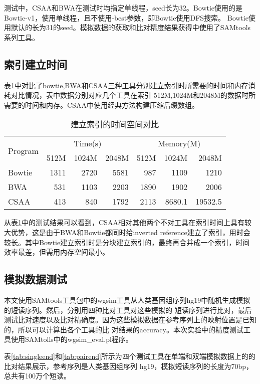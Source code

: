 测试中，CSAA和BWA在测试时均指定单线程，seed长为32。Bowtie使用的是Bowtie-v1，使用单线程，且不使用-best参数，即Bowtie使用DFS搜索。
Bowtie使用默认的长为31的seed。模拟数据的获取和比对精度结果获得中使用了SAMtools系列工具。

\subsection{索引建立时间}
表\ref{tab:tab1}中对比了bowtie,BWA和CSAA三种工具分别建立索引时所需要的时间和内存消耗对比情况，表中数据分别对应几个工具在索引
512M,1024M和2048M的数据时所需要的时间和内存。CSAA中使用经典方法构建压缩后缀数组。

\begin{table}[htbp]
    \caption{建立索引的时间空间对比}
    \label{tab:tab1}
    \centering
    \begin{tabular}{lrrrrrr}
        \hline
        \multirow{2}{*}{Program} & \multicolumn{3}{c}{Time(s)} & \multicolumn{3}{c}{Memory(M)}\\
        \cline{2-4}
        \cline{5-7}
        & 512M &1024M &2048M &512M &1024M &2048M\\
        \hline
        Bowtie&1311 &2720 &5581 &987 &1109 &1210 \\
        BWA&531 &1103 &2203 &1890 &1902 &2006 \\
        CSAA&413 &840 &1792 &2113 &8680.1 &19532.5 \\
        \hline
    \end{tabular}
\end{table}

从表\ref{tab:tab1}中的测试结果可以看到，CSAA相对其他两个不对工具在索引时间上具有较大优势，这是由于BWA和Bowtie都同时给inverted
reference建立了索引，用时会较长。其中Bowtie建立索引时是分块建立索引的，最终再合并成一个索引，时间效率最差，但需用内存空间最小。

\subsection{模拟数据测试}
本文使用SAMtools工具包中的wgsim工具从人类基因组序列hg19中随机生成模拟的短读序列。然后，分别用四种比对工具对这些模拟的
短读序列进行比对，最后测试比对速度以及比对精确度。因为这些模拟数据在参考序列上的映射位置是已知的，所以可以计算出各个工具的比
对结果的accuracy。本次实验中的精度测试工具使用SAMtolls中的wgsim\_eval.pl程序。

表\ref{tab:singleend}和\ref{tab:pairend}所示为四个测试工具在单端和双端模拟数据上的的比对结果展示，参考序列是人类基因组序列
hg19，模拟短读序列的长度为70bp，总共有100万个短读。

